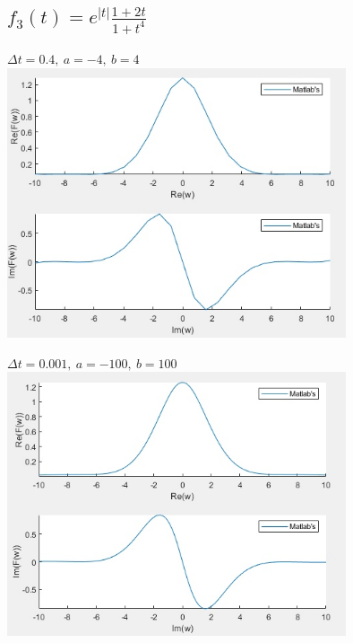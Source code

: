 \documentclass{article}
\begin{document}
{\large\subsection{$f_3(t) = e^{|t|}\frac{1+2t}{1+t^4}$}}
\begin{center}
  $\Delta t = 0.4,\ a = -4,\ b = 4$
  \includegraphics[width = 10cm, height 10cm]{f3_1.jpg}
  \vspace{1cm}
  
  $\Delta t = 0.001,\ a = -100,\ b = 100$
  \includegraphics[width = 10cm, height 10cm]{f3_2.jpg}
\end{center}

\newpage
\end{document}
